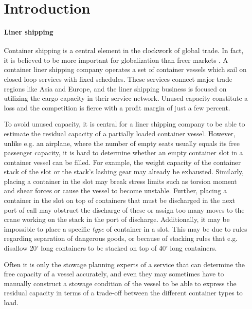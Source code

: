 


\section{Introduction}
\paragraph{Liner shipping}
Container shipping is a central element in the clockwork of global trade. In fact, it is believed to be more important for globalization than freer markets \cite{EC13}. A container liner shipping company operates a set of container vessels which sail on closed loop services with fixed schedules. These services connect major trade regions like Asia and Europe, and the liner shipping business is focused on utilizing the cargo capacity in their service network. Unused capacity constitute a loss and the competition is fierce with a profit margin of just a few percent.  

To avoid unused capacity, it is central for a liner shipping company to be able to estimate the residual capacity of a partially loaded container vessel. However, unlike e.g. an airplane, where the number of empty seats usually equals its free passenger capacity, it is hard to determine whether an empty container slot in a container vessel can be filled. %
For example, the weight capacity of the container stack of the slot or the stack's lashing gear may already be exhausted. 
Similarly, placing a container in the slot may break stress limits such as torsion moment and shear forces or cause the vessel to become unstable.
Further, placing a container in the slot on top of containers that must be discharged in the next port of call may obstruct the discharge of these or assign too many moves to the crane working on the stack in the port of discharge. 
%
Additionally, it may be impossible to place a specific \emph{type} of container in a slot. This may be due to rules regarding separation of dangerous goods, or because of stacking rules that e.g. disallow 20' long containers to be stacked on top of 40' long containers. 

Often it is only the stowage planning experts of a service that can determine the free capacity of a vessel accurately, and even they may sometimes have to manually construct a stowage condition of the vessel to be able to express the residual capacity in terms of a trade-off between the different container types to load.

